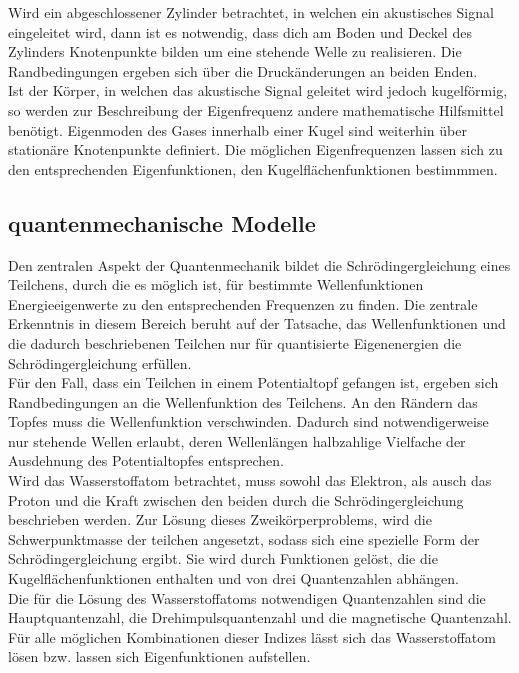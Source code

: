 Wird ein abgeschlossener Zylinder betrachtet, in welchen ein akustisches Signal 
eingeleitet wird, dann ist es notwendig, dass dich am Boden und Deckel des Zylinders 
Knotenpunkte bilden um eine stehende Welle zu realisieren. Die Randbedingungen ergeben 
sich über die Druckänderungen an beiden Enden.\\

Ist der Körper, in welchen das akustische Signal geleitet wird jedoch kugelförmig, so 
werden zur Beschreibung der Eigenfrequenz andere mathematische Hilfsmittel benötigt.
Eigenmoden des Gases innerhalb einer Kugel sind weiterhin über stationäre Knotenpunkte 
definiert. Die möglichen Eigenfrequenzen lassen sich zu den entsprechenden 
Eigenfunktionen, den Kugelflächenfunktionen bestimmmen. 

\subsection{quantenmechanische Modelle}
Den zentralen Aspekt der Quantenmechanik bildet die Schrödingergleichung eines Teilchens,
durch die es möglich ist, für bestimmte Wellenfunktionen Energieeigenwerte zu den 
entsprechenden Frequenzen zu finden. Die zentrale Erkenntnis in diesem Bereich beruht 
auf  der Tatsache, das Wellenfunktionen und die dadurch beschriebenen Teilchen nur für 
quantisierte Eigenenergien die Schrödingergleichung erfüllen.\\

Für den Fall, dass ein Teilchen in einem Potentialtopf gefangen ist, ergeben sich
Randbedingungen an die Wellenfunktion des Teilchens. An den Rändern das Topfes muss die 
Wellenfunktion verschwinden. Dadurch sind notwendigerweise nur stehende Wellen erlaubt, 
deren Wellenlängen halbzahlige Vielfache der Ausdehnung des Potentialtopfes entsprechen.\\

Wird das Wasserstoffatom betrachtet, muss sowohl das Elektron, als ausch das Proton 
und die Kraft zwischen den beiden durch die Schrödingergleichung beschrieben werden.
Zur Lösung dieses Zweikörperproblems, wird die Schwerpunktmasse der teilchen angesetzt, 
sodass sich eine spezielle Form der Schrödingergleichung ergibt. Sie wird durch Funktionen 
gelöst, die die Kugelflächenfunktionen enthalten und von drei Quantenzahlen abhängen.\\

Die für die Lösung des Wasserstoffatoms notwendigen Quantenzahlen sind die Hauptquantenzahl,
die Drehimpulsquantenzahl und die magnetische Quantenzahl. Für alle möglichen Kombinationen dieser
Indizes lässt sich das Wasserstoffatom lösen bzw. lassen sich Eigenfunktionen aufstellen.\\

